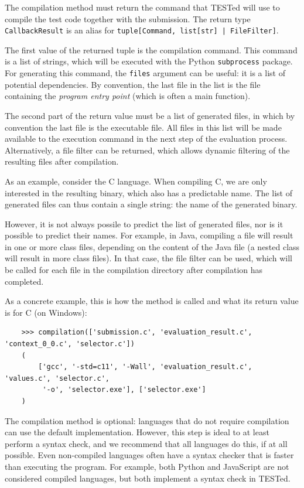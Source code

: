 \documentclass[../main]{subfiles}
\begin{document}
The compilation method must return the command that TESTed will use to compile the test code together with the submission.
The return type \texttt{CallbackResult} is an alias for \texttt{tuple[Command, list[str] | FileFilter]}.

The first value of the returned tuple is the compilation command.
This command is a list of strings, which will be executed with the Python \texttt{subprocess} package.
For generating this command, the \texttt{files} argument can be useful: it is a list of potential dependencies.
By convention, the last file in the list is the file containing the \emph{program entry point} (which is often a main function).

The second part of the return value must be a list of generated files, in which by convention the last file is the executable file.
All files in this list will be made available to the execution command in the next step of the evaluation process.
Alternatively, a file filter can be returned, which allows dynamic filtering of the resulting files after compilation.

As an example, consider the C language.
When compiling C, we are only interested in the resulting binary, which also has a predictable name.
The list of generated files can thus contain a single string: the name of the generated binary.

However, it is not always possile to predict the list of generated files, nor is it possible to predict their names.
For example, in Java, compiling a file will result in one or more class files, depending on the content of the Java file (a nested class will result in more class files).
In that case, the file filter can be used, which will be called for each file in the compilation directory after compilation has completed.

As a concrete example, this is how the method is called and what its return value is for C (on Windows):

\begin{verbatim}
    >>> compilation(['submission.c', 'evaluation_result.c', 'context_0_0.c', 'selector.c'])
    (
        ['gcc', '-std=c11', '-Wall', 'evaluation_result.c', 'values.c', 'selector.c',
         '-o', 'selector.exe'], ['selector.exe']
    )
\end{verbatim}

The compilation method is optional: languages that do not require compilation can use the default implementation.
However, this step is ideal to at least perform a syntax check, and we recommend that all languages do this, if at all possible.
Even non-compiled languages often have a syntax checker that is faster than executing the program.
For example, both Python and JavaScript are not considered compiled languages, but both implement a syntax check in TESTed.
\end{document}
